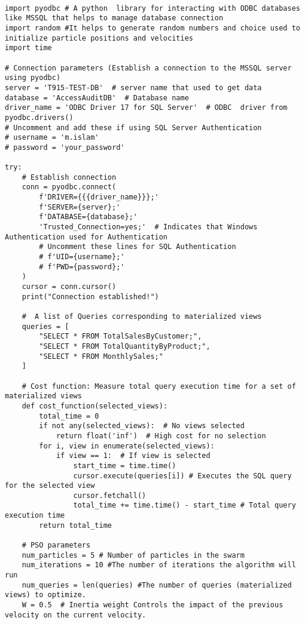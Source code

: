 
\begin{lstlisting}[style=pythonstyle, caption={Python script to automate optimal view.}, label={lst:pso_query_optimization}]

import pyodbc # A python  library for interacting with ODBC databases like MSSQL that helps to manage database connection
import random #It helps to generate random numbers and choice used to initialize particle positions and velocities
import time

# Connection parameters (Establish a connection to the MSSQL server using pyodbc)
server = 'T915-TEST-DB'  # server name that used to get data 
database = 'AccessAuditDB'  # Database name
driver_name = 'ODBC Driver 17 for SQL Server'  # ODBC  driver from pyodbc.drivers()
# Uncomment and add these if using SQL Server Authentication
# username = 'm.islam'
# password = 'your_password'

try:
    # Establish connection
    conn = pyodbc.connect(
        f'DRIVER={{{driver_name}}};'
        f'SERVER={server};'
        f'DATABASE={database};'
        'Trusted_Connection=yes;'  # Indicates that Windows Authentication used for Authentication
        # Uncomment these lines for SQL Authentication
        # f'UID={username};'
        # f'PWD={password};'
    )
    cursor = conn.cursor()
    print("Connection established!")

    #  A list of Queries corresponding to materialized views
    queries = [
        "SELECT * FROM TotalSalesByCustomer;",
        "SELECT * FROM TotalQuantityByProduct;",
        "SELECT * FROM MonthlySales;"
    ]

    # Cost function: Measure total query execution time for a set of materialized views 
    def cost_function(selected_views):
        total_time = 0
        if not any(selected_views):  # No views selected
            return float('inf')  # High cost for no selection
        for i, view in enumerate(selected_views):
            if view == 1:  # If view is selected
                start_time = time.time()
                cursor.execute(queries[i]) # Executes the SQL query for the selected view
                cursor.fetchall()
                total_time += time.time() - start_time # Total query execution time 
        return total_time

    # PSO parameters
    num_particles = 5 # Number of particles in the swarm 
    num_iterations = 10 #The number of iterations the algorithm will run
    num_queries = len(queries) #The number of queries (materialized views) to optimize.
    W = 0.5  # Inertia weight Controls the impact of the previous velocity on the current velocity.


\end{lstlisting}
